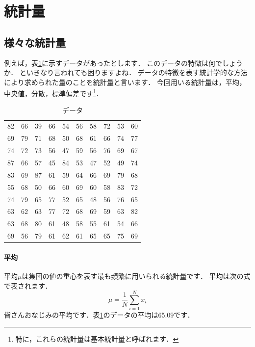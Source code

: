 \section{統計量}

\subsection{様々な統計量}

例えば，表\ref{tab:sample}に示すデータがあったとします．
このデータの特徴は何でしょうか．
といきなり言われても困りますよね．
データの特徴を表す統計学的な方法により求められた量のことを統計量と言います．
今回用いる統計量は，平均，中央値，分散，標準偏差です\footnote{特に，これらの統計量は基本統計量と呼ばれます．}．

\begin{table}[tb]
    \caption{データ}
    \centering
    \begin{tabular}{cccccccccc}
       82 & 66 & 39 & 66 & 54 & 56 & 58 & 72 & 53 & 60 \\
       69 & 79 & 71 & 68 & 50 & 68 & 61 & 66 & 74 & 77 \\
       74 & 72 & 73 & 56 & 47 & 59 & 56 & 76 & 69 & 67 \\
       87 & 66 & 57 & 45 & 84 & 53 & 47 & 52 & 49 & 74 \\
       83 & 69 & 87 & 61 & 59 & 64 & 66 & 69 & 79 & 68 \\
       55 & 68 & 50 & 66 & 60 & 69 & 60 & 58 & 83 & 72 \\
       74 & 79 & 65 & 77 & 52 & 65 & 48 & 56 & 76 & 65 \\
       63 & 62 & 63 & 77 & 72 & 68 & 69 & 59 & 63 & 82 \\
       63 & 68 & 80 & 61 & 48 & 58 & 55 & 61 & 54 & 66 \\
       69 & 56 & 79 & 61 & 62 & 61 & 65 & 65 & 75 & 69 \\
    \end{tabular}
    \label{tab:sample}
\end{table}

\paragraph{平均}
平均$\mu$は集団の値の重心を表す最も頻繁に用いられる統計量です．
平均は次の式で表されます．
\begin{equation}
    \mu = \frac{1}{N} \sum_{i=1}^{N} x_i
\end{equation}
皆さんおなじみの平均です．表\ref{tab:sample}のデータの平均は65.09です．


